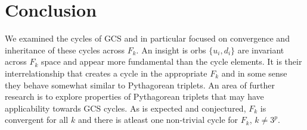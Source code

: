 \documentclass[12pt]{article} %
\begin{document}
\section{Conclusion}

We examined the cycles of GCS and in particular focused on convergence and inheritance of these cycles across $F_k$. An insight is orbs $\{u_i, d_i\}$ are invariant across $F_k$ space and appear more fundamental than the cycle elements. It is their interrelationship that creates a cycle in the appropriate $F_k$ and in some sense they behave somewhat similar to Pythagorean triplets. An area of further research is to explore properties of Pythagorean triplets that may have applicability towards GCS cycles. As is expected and conjectured, $F_k$ is convergent for all $k$ and there is atleast one non-trivial cycle for $F_k$, $k \neq 3^p$. 
\end{document}
